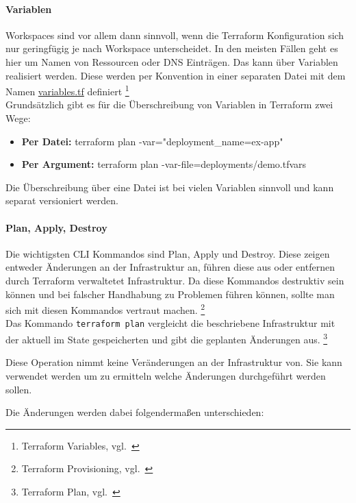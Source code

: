 \paragraph{Variablen}

Workspaces sind vor allem dann sinnvoll, wenn die Terraform Konfiguration sich nur geringfügig je nach Workspace unterscheidet.
In den meisten Fällen geht es hier um Namen von Ressourcen oder DNS Einträgen.
Das kann über Variablen realisiert werden.
Diese werden per Konvention in einer separaten Datei mit dem Namen \hyperref[lst:terraform_variables]{variables.tf} definiert
\footnote{Terraform Variables, vgl.~\cite{TERRAFORM_VARIABLES}} \\

Grundsätzlich gibt es für die Überschreibung von Variablen in Terraform zwei Wege:

\begin{itemize}
  \item \textbf{Per Datei:} terraform plan -var="deployment\_name=ex-app"
  \item \textbf{Per Argument:} terraform plan -var-file=deployments/demo.tfvars
\end{itemize}

Die Überschreibung über eine Datei ist bei vielen Variablen sinnvoll und kann separat versioniert werden.

\paragraph{Plan, Apply, Destroy}

Die wichtigsten CLI Kommandos sind Plan, Apply und Destroy.
Diese zeigen entweder Änderungen an der Infrastruktur an, führen diese aus oder entfernen durch Terraform verwaltetet Infrastruktur.
Da diese Kommandos destruktiv sein können und bei falscher Handhabung zu Problemen führen können, sollte man sich mit diesen Kommandos vertraut machen.
\footnote{Terraform Provisioning, vgl.~\cite{TERRAFORM_RUN}} \\


Das Kommando \texttt{terraform plan} vergleicht die beschriebene Infrastruktur mit der aktuell im State gespeicherten und gibt die geplanten Änderungen aus.
\footnote{Terraform Plan, vgl.~\cite{TERRAFORM_PLAN}}

Diese Operation nimmt keine Veränderungen an der Infrastruktur von.
Sie kann verwendet werden um zu ermitteln welche Änderungen durchgeführt werden sollen.

Die Änderungen werden dabei folgendermaßen unterschieden:

